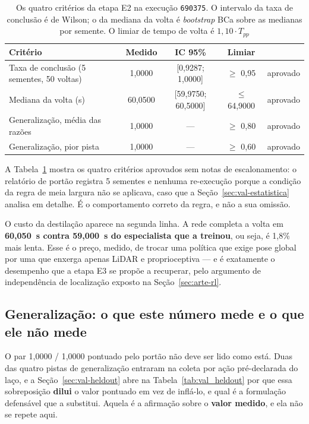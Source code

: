 \begin{table}[h]
    \centering
    \small
    \begin{tabularx}{\textwidth}{|>{\raggedright\arraybackslash}X|c|c|c|c|}
        \hline
        \textbf{Critério} & \textbf{Medido} & \textbf{IC 95\%} &
        \textbf{Limiar} & \\
        \hline
        Taxa de conclusão (5 sementes, 50 voltas) & 1,0000 &
        [0,9287; 1,0000] & $\geq$ 0,95 & aprovado \\
        \hline
        Mediana da volta (s) & 60,0500 & [59,9750; 60,5000] &
        $\leq$ 64,9000 & aprovado \\
        \hline
        Generalização, média das razões & 1,0000 & --- & $\geq$ 0,80 &
        aprovado \\
        \hline
        Generalização, pior pista & 1,0000 & --- & $\geq$ 0,60 & aprovado \\
        \hline
    \end{tabularx}
    \caption{Os quatro critérios da etapa E2 na execução \texttt{690375}. O
    intervalo da taxa de conclusão é de Wilson; o da mediana da volta é
    \textit{bootstrap} BCa sobre as medianas por semente. O limiar de tempo de
    volta é $1{,}10 \cdot T_{pp}$}
    \label{tab:res_e2_criterios}
\end{table}

A Tabela~\ref{tab:res_e2_criterios} mostra os quatro critérios aprovados sem
notas de escalonamento: o relatório de portão registra 5 sementes e nenhuma
re-execução porque a condição da regra de meia largura não se aplicava, caso que
a Seção~\ref{sec:val-estatistica} analisa em detalhe. É o comportamento correto
da regra, e não a sua omissão.

O custo da destilação aparece na segunda linha. A rede completa a volta em
\textbf{60,050~s contra 59,000~s do especialista que a treinou}, ou seja, é
1,8\% mais lenta. Esse é o preço, medido, de trocar uma política que exige pose
global por uma que enxerga apenas LiDAR e proprioceptiva --- e é exatamente o
desempenho que a etapa E3 se propõe a recuperar, pelo argumento de
independência de localização exposto na Seção~\ref{sec:arte-rl}.

\subsection{Generalização: o que este número mede e o que ele não mede}

O par 1,0000 / 1,0000 pontuado pelo portão não deve ser lido como está. Duas das
quatro pistas de generalização entraram na coleta por ação pré-declarada do laço,
e a Seção~\ref{sec:val-heldout} abre na Tabela~\ref{tab:val_heldout} por que
essa sobreposição \textbf{dilui} o valor pontuado em vez de inflá-lo, e qual é a
formulação defensável que a substitui. Aquela é a afirmação sobre o \textbf{valor
medido}, e ela não se repete aqui.


